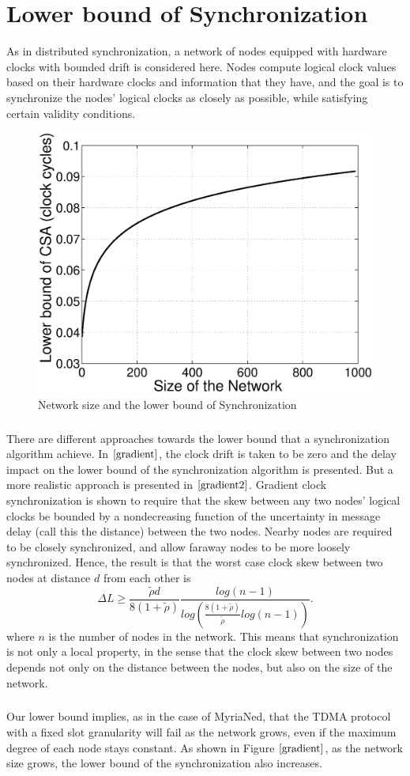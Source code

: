 \documentclass[a4paper,10pt]{report}
\begin{document}
\chapter{\textbf{Lower bound of Synchronization}}
As in distributed synchronization, a network of nodes equipped with hardware clocks with bounded drift is considered
here. Nodes compute logical clock values based on their hardware clocks and information that they have, and the goal is to
synchronize the nodes' logical clocks as closely as possible, while satisfying certain validity conditions.
\begin{figure}[!h]
\centering
\includegraphics[width=0.5 \textwidth]{lowerbound}
\caption{Network size and the lower bound of Synchronization}
\label{gradient}
\end{figure} \paragraph*{}
There are different approaches towards the lower bound that a synchronization algorithm achieve. In $\cite{gradient}$, the clock drift is taken to be zero and the delay impact on the lower bound of the synchronization algorithm is presented. But a more realistic approach is presented in $\cite{gradient2}$. Gradient clock synchronization is shown to require that the skew between any two nodes' logical clocks be
bounded by a nondecreasing function of the uncertainty in message delay (call this the distance) between the two nodes. Nearby nodes
are required to be closely synchronized, and allow faraway nodes to be more loosely synchronized. Hence, the result is that the worst
case clock skew between two nodes at distance $d$ from each other is
\begin{equation}
\Delta L \geq \frac{\tilde \rho d}{8(1+\tilde \rho)}\frac{log(n-1)}{log(\frac{8(1+\tilde \rho)}{\tilde \rho}log(n-1))}.
\end{equation}
where $n$ is the number of nodes in the network. This means that synchronization is not only a local property, in the sense that the clock skew between two nodes depends not only on the distance between the nodes, but also on the size of the network. \paragraph*{}
Our lower bound implies, as in the case of MyriaNed, that the TDMA protocol with a fixed slot granularity will fail as the network grows, even if the maximum degree of each node stays constant.
As shown in Figure $\ref{gradient}$, as the network size grows, the lower bound of the synchronization also increases.
\end{document}
